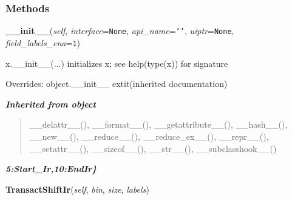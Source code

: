   \subsubsection{Methods}

    \vspace{0.5ex}

\hspace{.8\funcindent}\begin{boxedminipage}{\funcwidth}

    \raggedright \textbf{\_\_init\_\_}(\textit{self}, \textit{interface}={\tt None}, \textit{api\_name}={\tt \texttt{'}\texttt{}\texttt{'}}, \textit{uiptr}={\tt None}, \textit{field\_labels\_ena}={\tt 1})

\setlength{\parskip}{2ex}
    x.\_\_init\_\_(...) initializes x; see help(type(x)) for signature

\setlength{\parskip}{1ex}
      Overrides: object.\_\_init\_\_ 	extit{(inherited documentation)}

    \end{boxedminipage}


\large{\textbf{\textit{Inherited from object}}}

\begin{quote}
\_\_delattr\_\_(), \_\_format\_\_(), \_\_getattribute\_\_(), \_\_hash\_\_(), \_\_new\_\_(), \_\_reduce\_\_(), \_\_reduce\_ex\_\_(), \_\_repr\_\_(), \_\_setattr\_\_(), \_\_sizeof\_\_(), \_\_str\_\_(), \_\_subclasshook\_\_()
\end{quote}

\large{\textbf{\textit{5:Start\_Ir,10:EndIr\}}}}

    \label{hpl_tap_engine:HplTapEngine:TransactShiftIr}

    \vspace{0.5ex}

\hspace{.8\funcindent}\begin{boxedminipage}{\funcwidth}

    \raggedright \textbf{TransactShiftIr}(\textit{self}, \textit{bin}, \textit{size}, \textit{labels})

\setlength{\parskip}{2ex}
\setlength{\parskip}{1ex}
    \end{boxedminipage}

    \label{hpl_tap_engine:HplTapEngine:TransactShiftDr}

